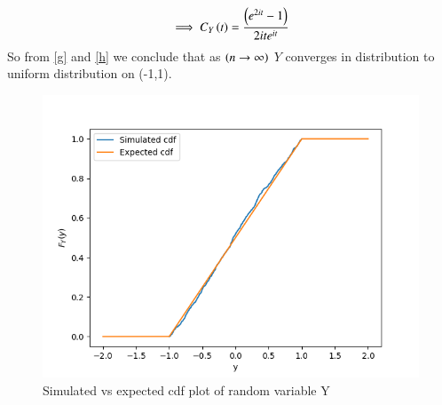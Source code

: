 \documentclass[journal,12pt,twocolumn]{IEEEtran}
\begin{document}
\begin{align}
    \implies C_{Y}\left(t\right)=\frac{\left(e^{2it}-1\right)}{2ite^{it}}
    \label{h}
\end{align}
So from \eqref{g} and \eqref{h} we conclude that as $\left(n\rightarrow\infty\right)$ $Y$ converges in distribution to uniform distribution on (-1,1).
\begin{figure}[h]
    \centering
    \includegraphics[width=\linewidth]{simulated_cdf.png}
    \caption{Simulated vs expected cdf plot of random variable Y}
    \label{cdf_plot}
\end{figure}
\end{document}
